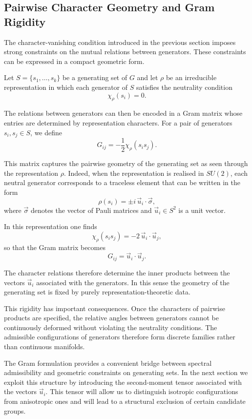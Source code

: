 \subsection{Pairwise Character Geometry and Gram Rigidity}
  \label{subsec:gram-rigidity}

  The character-vanishing condition introduced in the previous section
  imposes strong constraints on the mutual relations between generators.
  These constraints can be expressed in a compact geometric form.

  Let $S=\{s_1,\ldots,s_k\}$ be a generating set of $G$ and let $\rho$
  be an irreducible representation in which each generator of $S$
  satisfies the neutrality condition
  \[
    \chi_\rho(s_i)=0 .
  \]

  The relations between generators can then be encoded in a Gram matrix
  whose entries are determined by representation characters.
  For a pair of generators $s_i,s_j\in S$, we define
  \begin{equation}
    G_{ij}=-\frac{1}{2}\chi_\rho(s_i s_j).
  \end{equation}

  This matrix captures the pairwise geometry of the generating set as
  seen through the representation $\rho$.
  Indeed, when the representation is realised in $SU(2)$,
  each neutral generator corresponds to a traceless element that can be
  written in the form
  \[
    \rho(s_i)=\pm i\,\vec{u}_i\cdot\vec{\sigma},
  \]
  where $\vec{\sigma}$ denotes the vector of Pauli matrices and
  $\vec{u}_i\in S^2$ is a unit vector.

  In this representation one finds
  \[
    \chi_\rho(s_i s_j)=-2\,\vec{u}_i\cdot\vec{u}_j,
  \]
  so that the Gram matrix becomes
  \[
    G_{ij}=\vec{u}_i\cdot\vec{u}_j .
  \]

  The character relations therefore determine the inner products between
  the vectors $\vec{u}_i$ associated with the generators.
  In this sense the geometry of the generating set is fixed by purely
  representation-theoretic data.

  This rigidity has important consequences.
  Once the characters of pairwise products are specified, the relative
  angles between generators cannot be continuously deformed without
  violating the neutrality conditions.
  The admissible configurations of generators therefore form discrete
  families rather than continuous manifolds.

  The Gram formulation provides a convenient bridge between spectral
  admissibility and geometric constraints on generating sets.
  In the next section we exploit this structure by introducing the
  second-moment tensor associated with the vectors $\vec{u}_i$.
  This tensor will allow us to distinguish isotropic configurations
  from anisotropic ones and will lead to a structural exclusion of
  certain candidate groups.
